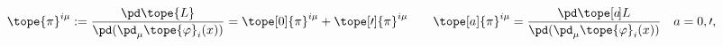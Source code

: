 \begin{equation}	\label{12.2}
\tope{\pi}^{i\mu}
:=
\frac{\pd\tope{L}}{\pd(\pd_\mu\tope{\varphi}_i(x))}
=
\tope[0]{\pi}^{i\mu} + \tope[\prime]{\pi}^{i\mu}
\qquad
\tope[a]{\pi}^{i\mu} = \frac{\pd\tope[a\mspace{-3mu}]{L}}
				{\pd(\pd_\mu\tope{\varphi}_i(x))}
\quad
a=0,\prime ,
	\end{equation}

